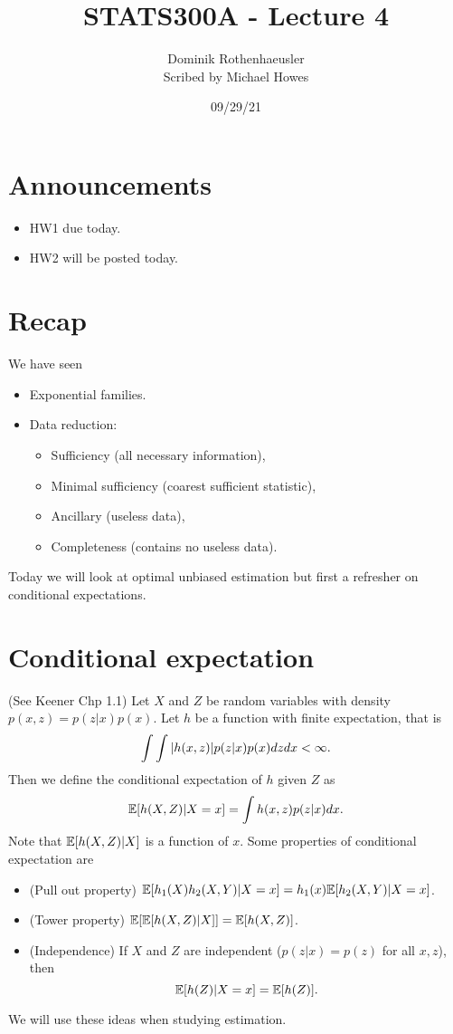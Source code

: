 




\title{STATS300A - Lecture 4}
\author{Dominik Rothenhaeusler\\ Scribed by Michael Howes}
\date{09/29/21}

\pagestyle{fancy}
\fancyhf{}


\maketitle
\tableofcontents
\section{Announcements}
\begin{itemize}
    \item HW1 due today.
    \item HW2 will be posted today.
\end{itemize}
\section{Recap}
We have seen
\begin{itemize}
    \item Exponential families.
    \item Data reduction:
    \begin{itemize}
        \item Sufficiency (all necessary information),
        \item Minimal sufficiency (coarest sufficient statistic),
        \item Ancillary (useless data),
        \item Completeness (contains no useless data).
    \end{itemize}
\end{itemize}
Today we will look at optimal unbiased estimation but first a refresher on conditional expectations.
\section{Conditional expectation}
(See Keener Chp 1.1) Let $X$ and $Z$ be random variables with density $p(x,z) = p(z|x)p(x)$. Let $h$ be a function with finite expectation, that is
\[\int\int {\left\lvert h(x,z)\right\rvert}p(z|x)p(x)dzdx < \infty. \]
Then we define the conditional expectation of $h$ given $Z$ as
\[{\mathbb{E}}[h(X,Z)|X=x] = \int h(x,z)p(z|x)dx. \]
Note that ${\mathbb{E}}[h(X,Z)|X]$ is a function of $x$. Some properties of conditional expectation are 
\begin{itemize}
    \item (Pull out property) ${\mathbb{E}}[h_1(X)h_2(X,Y)|X=x] = h_1(x){\mathbb{E}}[h_2(X,Y)|X=x]$.
    \item (Tower property) ${\mathbb{E}}[{\mathbb{E}}[h(X,Z)|X]] = {\mathbb{E}}[h(X,Z)]$.
    \item (Independence) If $X$ and $Z$ are independent ($p(z|x) = p(z)$ for all $x,z$), then \[{\mathbb{E}}[h(Z)|X=x] = {\mathbb{E}}[h(Z)].\] 
\end{itemize}
We will use these ideas when studying estimation.
